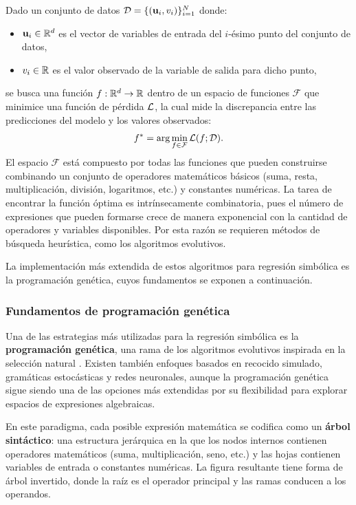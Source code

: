 \documentclass[12pt,a4paper]{article} \usepackage[utf8]{inputenc} \usepackage[spanish]{babel} \usepackage{amsmath, amssymb, amsthm} \usepackage{bm} \usepackage{float} \usepackage{longtable} \usepackage[hidelinks]{hyperref}
\begin{document}
Dado un conjunto de datos \(\mathcal{D} = \{(\mathbf{u}_i, v_i)\}_{i=1}^{N}\) donde:
\begin{itemize}
 \item \(\mathbf{u}_i \in \mathbb{R}^d\) es el vector de variables de entrada del \(i\)-ésimo punto del conjunto de datos, \item \(v_i \in \mathbb{R}\) es el valor observado de la variable de salida para dicho punto,
\end{itemize}
se busca una función \(f: \mathbb{R}^d \to \mathbb{R}\) dentro de un espacio de funciones \(\mathcal{F}\) que minimice una función de pérdida \(\mathcal{L}\), la cual mide la discrepancia entre las predicciones del modelo y los valores observados:
\begin{equation}
f^* = \arg\min_{f \in \mathcal{F}} \mathcal{L}(f; \mathcal{D}).
\end{equation}
El espacio \(\mathcal{F}\) está compuesto por todas las funciones que pueden construirse combinando un conjunto de operadores matemáticos básicos (suma, resta, multiplicación, división, logaritmos, etc.) y constantes numéricas. La tarea de encontrar la función óptima es intrínsecamente combinatoria, pues el número de expresiones que pueden formarse crece de manera exponencial con la cantidad de operadores y variables disponibles. Por esta razón se requieren métodos de búsqueda heurística, como los algoritmos evolutivos.

La implementación más extendida de estos algoritmos para regresión simbólica es la programación genética, cuyos fundamentos se exponen a continuación.

\subsubsection{Fundamentos de programación genética}

Una de las estrategias más utilizadas para la regresión simbólica es la \textbf{programación genética}, una rama de los algoritmos evolutivos inspirada en la selección natural \cite{koza1992genetic}. Existen también enfoques basados en recocido simulado, gramáticas estocásticas y redes neuronales, aunque la programación genética sigue siendo una de las opciones más extendidas por su flexibilidad para explorar espacios de expresiones algebraicas.

En este paradigma, cada posible expresión matemática se codifica como un \textbf{árbol sintáctico}: una estructura jerárquica en la que los nodos internos contienen operadores matemáticos (suma, multiplicación, seno, etc.) y las hojas contienen variables de entrada o constantes numéricas. La figura resultante tiene forma de árbol invertido, donde la raíz es el operador principal y las ramas conducen a los operandos.
\end{document}

